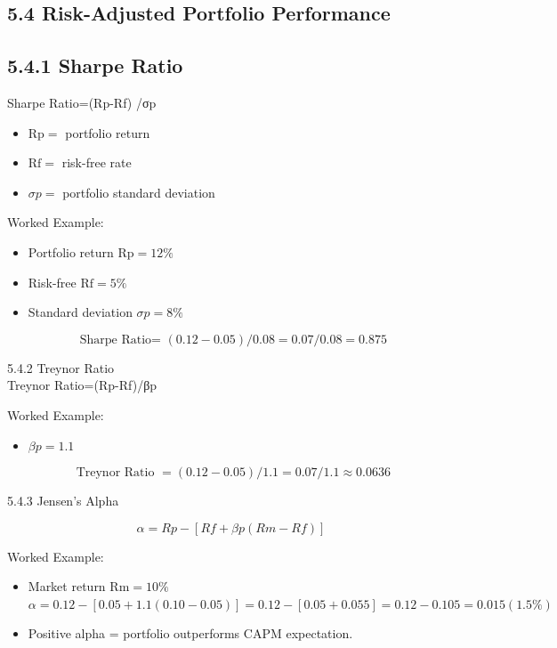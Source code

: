 \documentclass[10pt]{article}
\begin{document}
\subsection*{5.4 Risk-Adjusted Portfolio Performance}
\subsection*{5.4.1 Sharpe Ratio}
Sharpe Ratio=(Rp-Rf) /σp

\begin{itemize}
  \item $\mathrm{Rp}=$ portfolio return
  \item $\mathrm{Rf}=$ risk-free rate
  \item $\sigma p=$ portfolio standard deviation
\end{itemize}

Worked Example:

\begin{itemize}
  \item Portfolio return $\mathrm{Rp}=12 \%$
  \item Risk-free $\mathrm{Rf}=5 \%$
  \item Standard deviation $\sigma p=8 \%$
\end{itemize}

$$
\text { Sharpe Ratio= }(0.12-0.05) / 0.08=0.07 / 0.08=0.875
$$

5.4.2 Treynor Ratio\\
Treynor Ratio=(Rp-Rf)/βp

Worked Example:

\begin{itemize}
  \item $\beta p=1.1$
\end{itemize}

$$
\text { Treynor Ratio }=(0.12-0.05) / 1.1=0.07 / 1.1 \approx 0.0636
$$

5.4.3 Jensen’s Alpha

$$
\alpha=R p-[R f+\beta p(R m-R f)]
$$

Worked Example:

\begin{itemize}
  \item Market return $\mathrm{Rm}=10 \%$\\
$\alpha=0.12-[0.05+1.1(0.10-0.05)]=0.12-[0.05+0.055]=0.12-0.105=0.015(1.5 \%)$
  \item Positive alpha = portfolio outperforms CAPM expectation.
\end{itemize}
\end{document}
